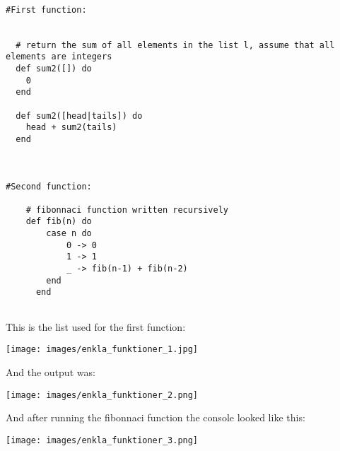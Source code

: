 \documentclass[a4paper,11pt]{article}
\begin{document}
\begin{verbatim}

#First function:


  # return the sum of all elements in the list l, assume that all elements are integers
  def sum2([]) do
    0
  end

  def sum2([head|tails]) do
    head + sum2(tails)
  end
  
 

#Second function:
    
    # fibonnaci function written recursively
    def fib(n) do
        case n do
            0 -> 0
            1 -> 1
            _ -> fib(n-1) + fib(n-2)
        end
      end
  
 \end{verbatim}
 
 This is the list used for the first function:

\texttt{[image: images/enkla\_funktioner\_1.jpg]}

And the output was:

\texttt{[image: images/enkla\_funktioner\_2.png]}

And after running the fibonnaci function the console looked like this:

\texttt{[image: images/enkla\_funktioner\_3.png]}
\end{document}
